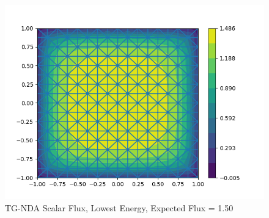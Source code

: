 \begin{figure}[H]
    \centering
    \includegraphics[width=\textwidth]{fig/tgnda_multi_group1.png}
    \caption{TG-NDA Scalar Flux, Lowest Energy, Expected Flux = 1.50}
    \label{fig:tgnda_multi_g2}
\end{figure}